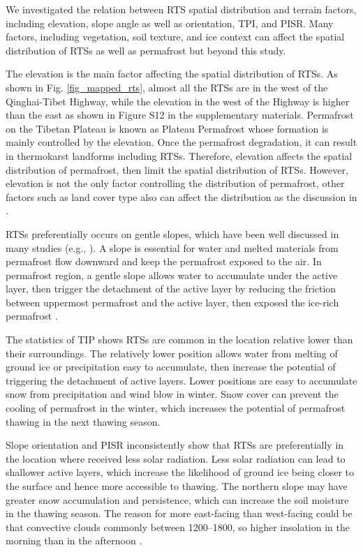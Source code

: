 \documentclass[preprint,12pt,authoryear]{elsarticle}
\begin{document}
We investigated the relation between RTS spatial distribution and terrain factors, including elevation, slope angle as well as orientation, TPI, and PISR. Many factors, including vegetation, soil texture, and ice context can affect the spatial distribution of RTSs as well as permafrost but beyond this study. 

The elevation is the main factor affecting the spatial distribution of RTSs. As shown in Fig. \ref{fig_mapped_rts}, almost all the RTSs are in the west of the Qinghai-Tibet Highway, while the elevation in the west of the Highway is higher than the east as shown in Figure S12 in the supplementary materials. Permafrost on the Tibetan Plateau is known as Plateau Permafrost whose formation is mainly controlled by the elevation. Once the permafrost degradation, it can result in thermokarst landforms including RTSs. Therefore, elevation affects the spatial distribution of permafrost, then limit the spatial distribution of RTSs. However, elevation is not the only factor controlling the distribution of permafrost, other factors such as land cover type also can affect the distribution as the discussion in \citealp{yin2017effects}.

RTSs preferentially occurs on gentle slopes, which have been well discussed in many studies (e.g., \citealp{leibman1995cryogenic, niu2014thaw, lacelle_distribution_2015}). A slope is essential for water and melted materials from permafrost flow downward and keep the permafrost exposed to the air. In permafrost region, a gentle slope allows water to accumulate under the active layer, then trigger the detachment of the active layer by reducing the friction between uppermost permafrost and the active layer, then exposed the ice-rich permafrost \citep{mcroberts1974stability, mcroberts1974the}. 

The statistics of TIP shows RTSs are common in the location relative lower than their surroundings. The relatively lower position allows water from melting of ground ice or precipitation easy to accumulate, then increase the potential of triggering the detachment of active layers. Lower positions are easy to accumulate snow from precipitation and wind blow in winter. Snow cover can prevent the cooling of permafrost in the winter, which increases the potential of permafrost thawing in the next thawing season. 

Slope orientation and PISR inconsistently show that RTSs are preferentially in the location where received less solar radiation. Less solar radiation can lead to shallower active layers, which increase the likelihood of ground ice being closer to the surface and hence more accessible to thawing. The northern slope may have greater snow accumulation and persistence, which can increase the soil moisture in the thawing season. The reason for more east-facing than west-facing could be that convective clouds commonly between 1200--1800, so higher insolation in the morning than in the afternoon \citep{niu2014thaw}.
\end{document}

